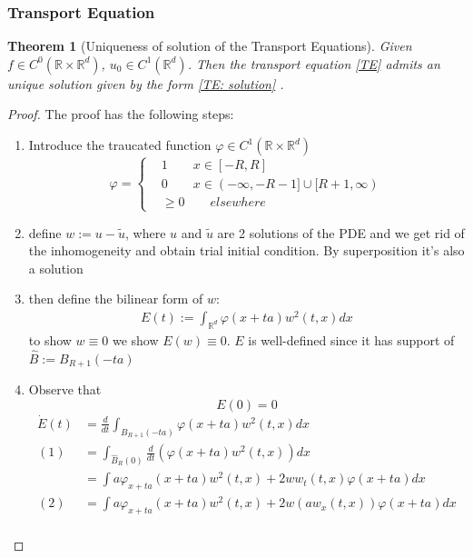 \documentclass[a4paper,11pt,oneside,fleqn]{book}
\newtheorem{theorem}{Theorem}[section]
\theoremstyle{definition}
\theoremstyle{remark}
\begin{document}
\subsubsection*{Transport Equation}
\begin{theorem}[Uniqueness of solution of the Transport Equations]
	Given $f \in C^0(\mathbb{R} \times \mathbb{R}^d)$, $u_0 \in C^1(\mathbb{R}^d)$. Then the transport equation \ref{TE}  admits an unique solution given by the form \ref{TE: solution} .
\end{theorem}
\begin{proof}
	The proof has the following steps:
	\begin{enumerate}
		\item Introduce the traucated function $\varphi \in C^1(\mathbb{R} \times \mathbb{R}^d)$
		\begin{equation*}
			\varphi = 
			\left\{
			\begin{aligned}
				&1 \qquad x \in [-R, R]\\
				&0 \qquad x \in (-\infty, -R-1] \cup [R + 1, \infty)\\
				& \geq 0 \qquad elsewhere
			\end{aligned}
			\right.
		\end{equation*}
		\item 
		define $w := u - \tilde{u}$, where $u$ and $\tilde{u}$ are 2 solutions of the PDE and we get rid of the inhomogeneity    and obtain trial initial condition. By superposition it's also a solution
		\item then define the bilinear form of $w$:
		\begin{align*}
			E(t) := \int_{\mathbb{R}^d} \varphi(x + ta) w^2(t, x) dx
		\end{align*}
		to show $w \equiv 0$ we show $E(w) \equiv 0$. $E$ is well-defined since it has support of $\hat{B}:= B_{R+1}(-ta)$		
		\item Observe that
		\begin{equation*}
			E(0) = 0
		\end{equation*}
		\begin{align*}
			\dot{E}(t) &= \frac{d}{dt} \int_{B_{R+1}(-ta)} \varphi(x + ta) w^2(t, x)dx\\
		 (1)&= \int_{\hat{B}_R(0)} \frac{d}{dt} (\varphi(x+ ta) w^2(t, x)) dx\\
			&= \int a\varphi_{x+ta}(x + ta) w^2(t, x) + 2w w_t(t, x) \varphi(x + ta) dx\\
		 (2)&= \int a \varphi_{x + ta}(x+ta)w^2(t, x) + 2w (aw_x(t, x))\varphi(x+ta) dx\\

\end{align*}
\end{enumerate}
\end{proof}
\end{document}
